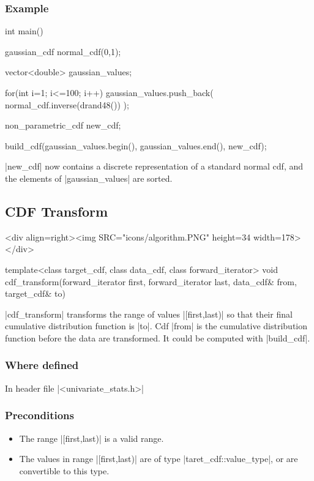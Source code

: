 \documentclass[12pt,twoside]{report}
\begin{document}
\htmlrule[CLEAR=all]  \subsubsection*{Example}

\begin{code}
int main()
{
  gaussian_cdf normal_cdf(0,1);

  vector<double> gaussian_values;

  for(int i=1; i<=100; i++)
    gaussian_values.push_back( normal_cdf.inverse(drand48()) );  

  non_parametric_cdf new_cdf;

  build_cdf(gaussian_values.begin(), gaussian_values.end(),
            new_cdf);
}
\end{code}


\noindent |new_cdf| now contains a discrete representation of a standard normal cdf, and the elements of |gaussian_values| are sorted. 








\subsection{CDF Transform}
\begin{htmlonly}
<div align=right><img SRC="icons/algorithm.PNG" height=34 width=178></div>
\end{htmlonly}



\begin{code}
template<class target_cdf, class data_cdf, class forward_iterator>
void
cdf_transform(forward_iterator first, forward_iterator last,
              data_cdf& from, target_cdf& to) 
\end{code}



|cdf_transform| transforms the range of values |[first,last)| so that their final cumulative distribution function is |to|. Cdf |from| is the cumulative distribution function before the data are transformed. It could be computed with |build_cdf|.

\htmlrule[CLEAR=all]  \subsubsection*{Where defined}
In header file |<univariate_stats.h>|


\htmlrule[CLEAR=all]  \subsubsection*{Preconditions}
\begin{itemize}
\item The range |[first,last)| is a valid range.

\item The values in range |[first,last)| are of type |taret_cdf::value_type|, or are convertible to this type.

\end{itemize}
\end{document}
